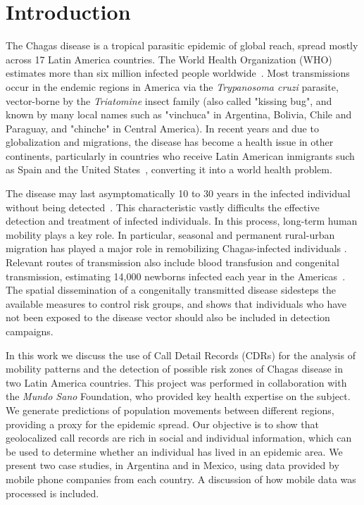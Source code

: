 \section{Introduction}

The Chagas disease is a tropical parasitic epidemic of global reach, spread mostly across 17 Latin America countries. The World Health Organization (WHO) estimates more than six million infected people worldwide~\cite{who2016}. Most transmissions occur in the endemic regions in America via the \textit{Trypanosoma cruzi} parasite, vector-borne by the \textit{Triatomine} insect family (also called "kissing bug", and known by many local names such as "vinchuca" in Argentina, Bolivia, Chile and Paraguay, and "chinche" in Central America). In recent years and due to globalization and migrations, the disease has become a health issue in other continents, particularly in countries who receive Latin American inmigrants such as Spain and the United States~\cite{schmunis2010chagas}, converting it into a world health problem.

The disease may last asymptomatically 10 to 30 years in the infected individual without being detected~\cite{rassi2012american}. This characteristic vastly difficults the effective detection and treatment of infected individuals. In this process, long-term human mobility plays a key role. In particular, seasonal and permanent rural-urban migration has played a major role in remobilizing Chagas-infected individuals \cite{briceno2009chagas}. 
Relevant routes of transmission also include blood transfusion and congenital transmission, estimating 14,000 newborns infected each year in the Americas~\cite{OPS2006chagas}.
The spatial dissemination of a congenitally transmitted disease sidesteps the available measures to control risk groups, and shows that individuals who have not been exposed to the disease vector should also be included in detection campaigns.

In this work we discuss the use of Call Detail Records (CDRs) for the analysis of mobility patterns and the detection of possible risk zones of Chagas disease in two Latin America countries. This project was performed in collaboration with the \textit{Mundo Sano} Foundation, who provided key health expertise on the subject. We generate predictions of population movements between different regions, providing a proxy for the epidemic spread. Our objective is to show that geolocalized call records are rich in social and individual information, which can be used to determine whether an individual has lived in an epidemic area. We present two case studies, in Argentina and in Mexico, using data provided by mobile phone companies from each country. A discussion of how mobile data was processed is included. 

